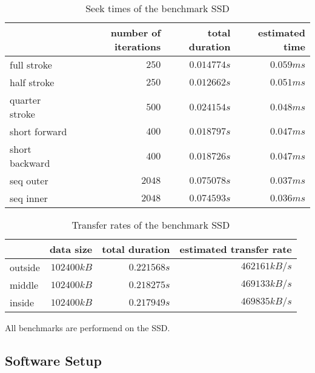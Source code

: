 \begin{table}[h]
\centering
\caption{Seek times of the benchmark SSD}
\label{eval-ssd-seek}
\begin{tabular}{lrrr}
\textbf{}      & \textbf{number of iterations} & \textbf{total duration} & \textbf{estimated time} \\ \hline
full stroke    & $250$                         & $0.014774 s$            & $0.059 ms$              \\
half stroke    & $250$                         & $0.012662 s$            & $0.051 ms$              \\
quarter stroke & $500$                         & $0.024154 s$            & $0.048 ms$              \\
short forward  & $400$                         & $0.018797 s$            & $0.047 ms$              \\
short backward & $400$                         & $0.018726 s$            & $0.047 ms$              \\
seq outer      & $2048$                        & $0.075078 s$            & $0.037 ms$              \\
seq inner      & $2048$                        & $0.074593 s$            & $0.036 ms$              \\ \hline
\end{tabular}
\end{table}

\begin{table}[h]
\centering
\caption{Transfer rates of the benchmark SSD}
\label{eval-ssd-transfer}
\begin{tabular}{lrrr}
\textbf{} & \textbf{data size} & \textbf{total duration} & \textbf{estimated transfer rate} \\ \hline
outside   & $102400 kB$        & $0.221568 s$            & $462161 kB/s$                    \\
middle    & $102400 kB$        & $0.218275 s$            & $469133 kB/s$                    \\
inside    & $102400 kB$        & $0.217949 s$            & $469835 kB/s$                    \\ \hline
\end{tabular}
\end{table}

All benchmarks are performend on the SSD.

  \subsection{Software Setup}

